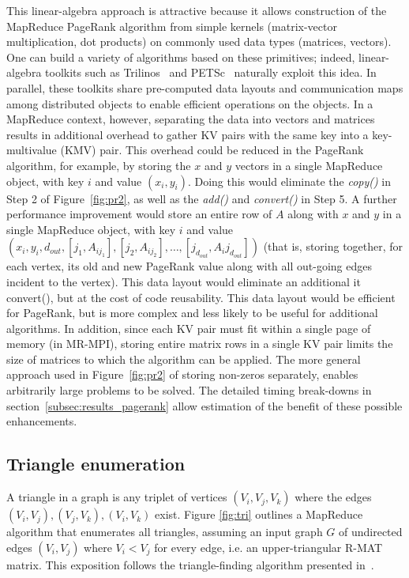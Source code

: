 This linear-algebra approach is attractive because it allows
construction of the MapReduce PageRank algorithm from simple kernels
(matrix-vector multiplication, dot products) on commonly used data
types (matrices, vectors).  One can build a variety of algorithms
based on these primitives; indeed, linear-algebra toolkits such as
Trilinos~\cite{Trilinos-Overview} and PETSc~\cite{petsc-efficient}
naturally exploit this idea.  In parallel, these toolkits share
pre-computed data layouts and communication maps among distributed
objects to enable efficient operations on the objects.  In a MapReduce
context, however, separating the data into vectors and matrices
results in additional overhead to gather KV pairs with the same key
into a key-multivalue (KMV) pair.  This overhead could be reduced in
the PageRank algorithm, for example, by storing the $x$ and $y$
vectors in a single MapReduce object, with key $i$ and value $(x_i,
y_i)$.  Doing this would eliminate the {\it copy()} in Step 2 of
Figure~\ref{fig:pr2}, as well as the {\it add()} and {\it convert()}
in Step 5.  A further performance improvement would store an entire
row of $A$ along with $x$ and $y$ in a single MapReduce object, with
key $i$ and value $(x_i, y_i, d_{out}, [j_1, A_{ij_1}], [j_2,
A_{ij_2}], \dots, [j_{d_{out}}, A_ij_{d_{out}}])$ (that is, storing
together, for each vertex, its old and new PageRank value along with
all out-going edges incident to the vertex).  This data layout would
eliminate an additional {it convert()}, but at the cost of code
reusability.  This data layout would be efficient for PageRank, but is
more complex and less likely to be useful for additional algorithms.
In addition, since each KV pair must fit within a single page of
memory (in MR-MPI), storing entire matrix rows in a single KV pair
limits the size of matrices to which the algorithm can be applied.
The more general approach used in Figure~\ref{fig:pr2} of storing
non-zeros separately, enables arbitrarily large problems to be solved.
The detailed timing break-downs in
section~\ref{subsec:results_pagerank} allow estimation of the benefit
of these possible enhancements.

\subsection{Triangle enumeration}

A triangle in a graph is any triplet of vertices $(V_i,V_j,V_k)$ where
the edges $(V_i,V_j), (V_j,V_k), (V_i,V_k)$ exist.  Figure
\ref{fig:tri} outlines a MapReduce algorithm that enumerates all
triangles, assuming an input graph $G$ of undirected edges $(V_i,V_j)$
where $V_i < V_j$ for every edge, i.e. an upper-triangular R-MAT
matrix.  This exposition follows the triangle-finding algorithm
presented in~\cite{Cohen09}.

